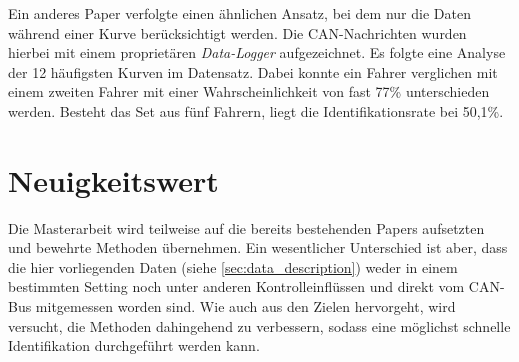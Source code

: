 Ein anderes Paper \cite{Hallac2016} verfolgte einen ähnlichen Ansatz, bei dem nur die Daten während einer Kurve berücksichtigt werden. Die CAN-Nachrichten wurden hierbei mit einem proprietären \textit{Data-Logger} aufgezeichnet. Es folgte eine Analyse der 12 häufigsten Kurven im Datensatz. Dabei konnte ein Fahrer verglichen mit einem zweiten Fahrer mit einer Wahrscheinlichkeit von fast 77\% unterschieden werden. Besteht das Set aus fünf Fahrern, liegt die Identifikationsrate bei 50,1\%.

\section{Neuigkeitswert}
\label{sec:novelty}

Die Masterarbeit wird teilweise auf die bereits bestehenden Papers aufsetzten und bewehrte Methoden übernehmen. Ein wesentlicher Unterschied ist aber, dass die hier vorliegenden Daten (siehe \ref{sec:data_description}) weder in einem bestimmten Setting noch unter anderen Kontrolleinflüssen und direkt vom CAN-Bus mitgemessen worden sind. Wie auch aus den Zielen hervorgeht, wird versucht, die Methoden dahingehend zu verbessern, sodass eine möglichst schnelle Identifikation durchgeführt werden kann.